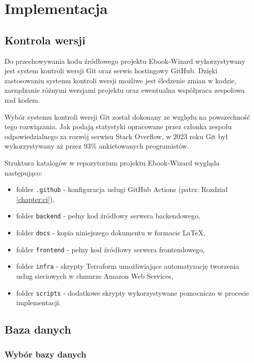 \chapter{Implementacja}
\label{chapter:implementation}

\section{Kontrola wersji}

Do przechowywania kodu źródłowego projektu Ebook-Wizard wykorzystywany jest system kontroli wersji Git oraz serwis hostingowy GitHub. Dzięki zastosowaniu systemu kontroli wersji możliwe jest śledzenie zmian w kodzie, zarządzanie różnymi wersjami projektu oraz ewentualna współpraca zespołowa nad kodem. \cite{pro_git}

Wybór systemu kontroli wersji Git został dokonany ze względu na powszechność tego rozwiązania. Jak podają statystyki opracowane przez członka zespołu odpowiedzialnego za rozwój serwisu Stack Overflow, w 2023 roku Git był wykorzystywany aż przez 93\% ankietowanych programistów. \cite{git_usage_stats}

Struktura katalogów w repozytorium projektu Ebook-Wizard wygląda następująco:
\begin{itemize}
    \item folder \verb|.github| - konfiguracja usługi GitHub Actions (patrz: Rozdział \ref{chapter:ci}),
    \item folder \verb|backend| - pełny kod źródłowy serwera backendowego,
    \item folder \verb|docs| - kopia niniejszego dokumentu w formacie LaTeX,
    \item folder \verb|frontend| - pełny kod źródłowy serwera frontendowego,
    \item folder \verb|infra| - skrypty Terraform umożliwiające automatyzację tworzenia usług sieciowych w chmurze Amazon Web Services,
    \item folder \verb|scripts| - dodatkowe skrypty wykorzystywane pomocniczo w procesie implementacji.
\end{itemize}

\section{Baza danych}

\subsection{Wybór bazy danych}

